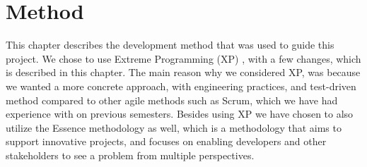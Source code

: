 
\chapter{Method}
\label{cha:method}

This chapter describes the development method that was used to guide this project. We chose to use Extreme Programming (XP) \parencite{xp}, with a few changes, which is described in this chapter. The main reason why we considered XP, was because we wanted a more concrete approach, with engineering practices, and test-driven method compared to other agile methods such as Scrum, which we have had experience with on previous semesters. Besides using XP we have chosen to also utilize the Essence methodology as well, which is a methodology that aims to support innovative projects, and focuses on enabling developers and other stakeholders to see a problem from multiple perspectives. 






